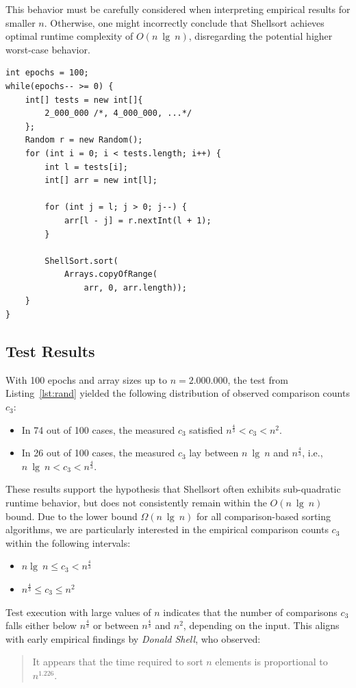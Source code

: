 This behavior must be carefully considered when interpreting empirical results for smaller $n$.
Otherwise, one might incorrectly conclude that Shellsort achieves optimal runtime complexity of $O(n\ \lg\ n)$, disregarding the potential higher worst-case behavior.

\vspace{4mm}
\begin{lstlisting}[style=javastyle, caption={Code for Shellsort-testing large randomized arrays.}, label=lst:rand]
int epochs = 100;
while(epochs-- >= 0) {
    int[] tests = new int[]{
        2_000_000 /*, 4_000_000, ...*/
    };
    Random r = new Random();
    for (int i = 0; i < tests.length; i++) {
        int l = tests[i];
        int[] arr = new int[l];

        for (int j = l; j > 0; j--) {
            arr[l - j] = r.nextInt(l + 1);
        }

        ShellSort.sort(
            Arrays.copyOfRange(
                arr, 0, arr.length));
    }
}
\end{lstlisting}
\vspace{4mm}

\subsection{Test Results}
With 100 epochs and array sizes up to $n = 2.000.000$, the test from Listing~\ref{lst:rand} yielded the following distribution of observed comparison counts $c_3$:

\begin{itemize}
    \item In 74 out of 100 cases, the measured $c_3$ satisfied $n^{\frac{4}{3}} < c_3 < n^2$.
    \item In 26 out of 100 cases, the measured $c_3$ lay between $n\ \lg\ n$ and $n^{\frac{4}{3}}$, i.e., $n\ \lg\ n < c_3 < n^{\frac{4}{3}}$.
\end{itemize}

These results support the hypothesis that Shellsort often exhibits sub-quadratic runtime behavior, but does not consistently remain within the $O(n\ \lg\ n)$ bound.
Due to the lower bound $\Omega(n\ \lg\ n)$ for all comparison-based sorting algorithms, we are particularly interested in the empirical comparison counts $c_3$ within the following intervals:

\begin{itemize}
    \item $n \lg\ n \leq c_3 < n^{\frac{4}{3}}$
    \item $n^{\frac{4}{3}} \leq c_3 \leq n^2$
\end{itemize}

Test execution with large values of $n$ indicates that the number of comparisons $c_3$ falls either below $n^{\frac{4}{3}}$ or between $n^{\frac{4}{3}}$ and $n^2$, depending on the input.
This aligns with early empirical findings by \textit{Donald Shell}, who observed:

\blockquote[{\cite[31]{She59}}]{
It appears that the time required to sort $n$ elements is proportional to $n^{1.226}$.
}




